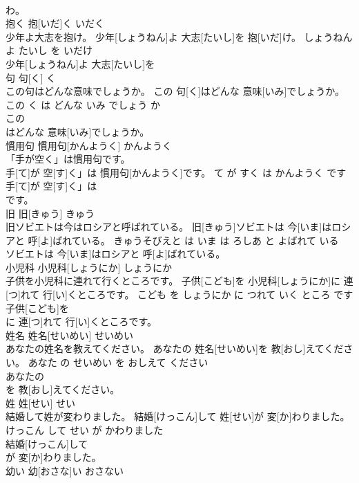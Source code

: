 \documentclass[8pt]{extreport}
\begin{document}
\begin{CJK}{UTF8}{min}
\\	わ。			
\\	抱く	抱[いだ]く	いだく	
\\	少年よ大志を抱け。	少年[しょうねん]よ 大志[たいし]を 抱[いだ]け。	しょうねん よ たいし を いだけ	
\\	少年[しょうねん]よ 大志[たいし]を
\\	句	句[く]	く	
\\	この句はどんな意味でしょうか。	この 句[く]はどんな 意味[いみ]でしょうか。	この く は どんな いみ でしょう か	
\\	この
\\	はどんな 意味[いみ]でしょうか。			
\\	慣用句	慣用句[かんようく]	かんようく	
\\	「手が空く」は慣用句です。	
\\	手[て]が 空[す]く」は 慣用句[かんようく]です。	て が すく は かんようく です	
\\	手[て]が 空[す]く」は
\\	です。			
\\	旧	旧[きゅう]	きゅう	
\\	旧ソビエトは今はロシアと呼ばれている。	旧[きゅう]ソビエトは 今[いま]はロシアと 呼[よ]ばれている。	きゅうそびえと は いま は ろしあ と よばれて いる	
\\	ソビエトは 今[いま]はロシアと 呼[よ]ばれている。			
\\	小児科	小児科[しょうにか]	しょうにか	
\\	子供を小児科に連れて行くところです。	子供[こども]を 小児科[しょうにか]に 連[つ]れて 行[い]くところです。	こども を しょうにか に つれて いく ところ です	
\\	子供[こども]を
\\	に 連[つ]れて 行[い]くところです。			
\\	姓名	姓名[せいめい]	せいめい	
\\	あなたの姓名を教えてください。	あなたの 姓名[せいめい]を 教[おし]えてください。	あなた の せいめい を おしえて ください	
\\	あなたの
\\	を 教[おし]えてください。			
\\	姓	姓[せい]	せい	
\\	結婚して姓が変わりました。	結婚[けっこん]して 姓[せい]が 変[か]わりました。	けっこん して せい が かわりました	
\\	結婚[けっこん]して
\\	が 変[か]わりました。			
\\	幼い	幼[おさな]い	おさない	

\end{CJK}
\end{document}
